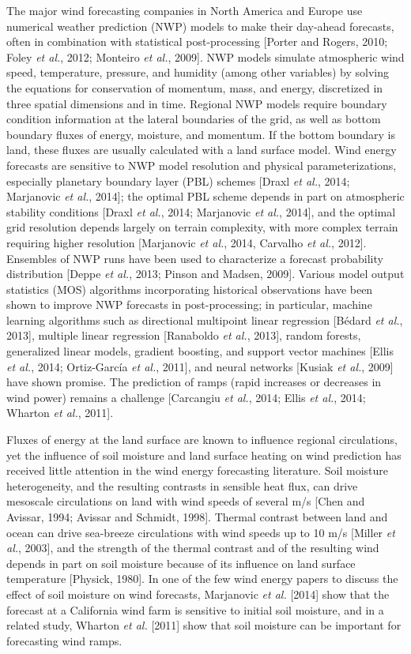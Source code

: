 The major wind forecasting companies in North America and Europe use numerical weather prediction (NWP) models to make their day-ahead forecasts, often in combination with statistical post-processing [Porter and Rogers, 2010; Foley \textit{et al.}, 2012; Monteiro \textit{et al.}, 2009].  NWP models simulate atmospheric wind speed, temperature, pressure, and humidity (among other variables) by solving the equations for conservation of momentum, mass, and energy, discretized in three spatial dimensions and in time.  Regional NWP models require boundary condition information at the lateral boundaries of the grid, as well as bottom boundary fluxes of energy, moisture, and momentum.  If the bottom boundary is land, these fluxes are usually calculated with a land surface model.  Wind energy forecasts are sensitive to NWP model resolution and physical parameterizations, especially planetary boundary layer (PBL) schemes [Draxl \textit{et al.}, 2014; Marjanovic \textit{et al.}, 2014]; the optimal PBL scheme depends in part on atmospheric stability conditions [Draxl \textit{et al.}, 2014; Marjanovic \textit{et al.}, 2014], and the optimal grid resolution depends largely on terrain complexity, with more complex terrain requiring higher resolution [Marjanovic \textit{et al.}, 2014, Carvalho \textit{et al.}, 2012].  Ensembles of NWP runs have been used to characterize a forecast probability distribution [Deppe \textit{et al.}, 2013; Pinson and Madsen, 2009].  Various model output statistics (MOS) algorithms incorporating historical observations have been shown to improve NWP forecasts in post-processing; in particular, machine learning algorithms such as directional multipoint linear regression [B\'edard \textit{et al.}, 2013], multiple linear regression [Ranaboldo \textit{et al.}, 2013], random forests, generalized linear models, gradient boosting, and support vector machines [Ellis \textit{et al.}, 2014; Ortiz-Garc\'ia \textit{et al.}, 2011], and neural networks [Kusiak \textit{et al.}, 2009] have shown promise.  The prediction of ramps (rapid increases or decreases in wind power) remains a challenge [Carcangiu \textit{et al.}, 2014; Ellis \textit{et al.}, 2014; Wharton \textit{et al.}, 2011].

Fluxes of energy at the land surface are known to influence regional circulations, yet the influence of soil moisture and land surface heating on wind prediction has received little attention in the wind energy forecasting literature.  Soil moisture heterogeneity, and the resulting contrasts in sensible heat flux, can drive mesoscale circulations on land with wind speeds of several m/s [Chen and Avissar, 1994; Avissar and Schmidt, 1998].  Thermal contrast between land and ocean can drive sea-breeze circulations with wind speeds up to 10 m/s [Miller \textit{et al.}, 2003], and the strength of the thermal contrast and of the resulting wind depends in part on soil moisture because of its influence on land surface temperature [Physick, 1980].  In one of the few wind energy papers to discuss the effect of soil moisture on wind forecasts, Marjanovic \textit{et al.} [2014] show that the forecast at a California wind farm is sensitive to initial soil moisture, and in a related study, Wharton \textit{et al.} [2011] show that soil moisture can be important for forecasting wind ramps.

